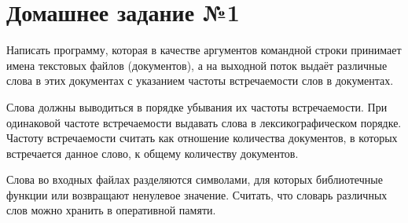 \section*{Домашнее задание №1}

Написать программу, которая в качестве аргументов командной строки
принимает имена текстовых файлов (документов), а на выходной поток
выдаёт различные слова в этих документах с указанием частоты
встречаемости слов в документах.

Слова должны выводиться в порядке
убывания их частоты встречаемости. При одинаковой частоте
встречаемости выдавать слова в лексикографическом порядке. Частоту
встречаемости считать как отношение количества документов, в которых
встречается данное слово, к общему количеству документов.

Слова во
входных файлах разделяются символами, для которых библиотечные
функции  или  возвращают ненулевое значение. Считать,
что словарь различных слов можно хранить в оперативной памяти.
